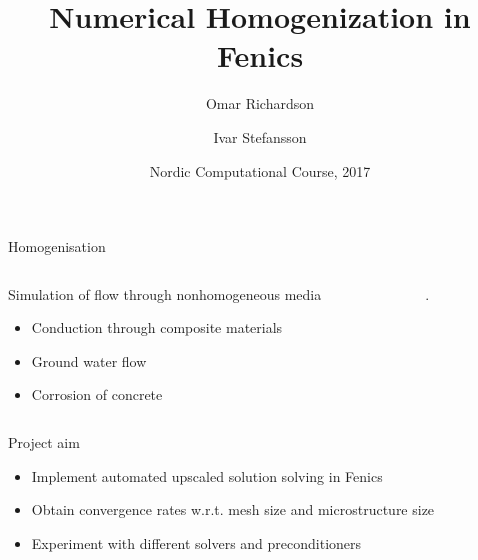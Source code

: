 \documentclass{beamer}
\title[Numerical homogenization]{Numerical Homogenization in Fenics}
\author[O. Richardson \and I. Stefansson] %
{Omar Richardson \and Ivar Stefansson}
\institute %
{
    Karlstad University, Sweden \and University of Bergen, Norway
}
\date[]{Nordic Computational Course, 2017}
\begin{document}
  \frame{\titlepage}
\begin{frame}{Homogenisation}
    \begin{columns}
        \begin{column}[c]{.5\textwidth}
            Simulation of flow through nonhomogeneous media
            \begin{itemize}
              \item Conduction through composite materials
              \item Ground water flow
              \item Corrosion of concrete
            \end{itemize}
        \end{column}
        \begin{column}[c]{.5\textwidth}
            .
        \end{column}
    \end{columns}
\end{frame}

\begin{frame}[c]{Project aim}
    \begin{itemize}
        \item Implement automated upscaled solution solving in Fenics
        \item Obtain convergence rates w.r.t. mesh size and microstructure size
        \item Experiment with different solvers and preconditioners
    \end{itemize}
\end{frame}
\end{document}

